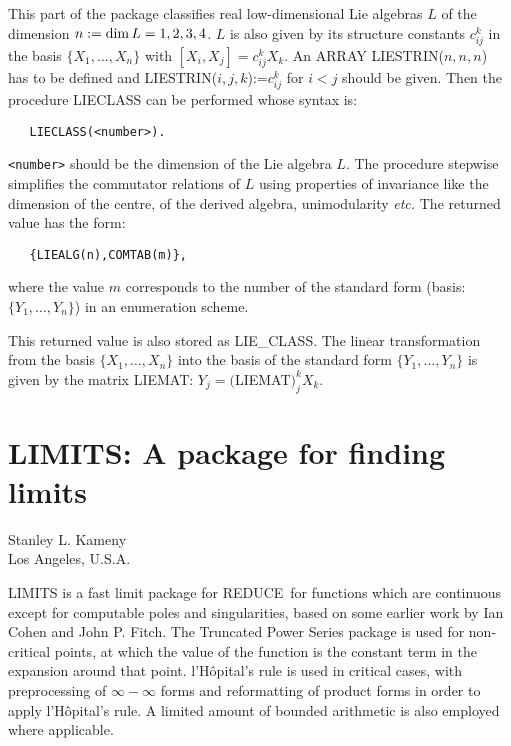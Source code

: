 \documentclass[11pt,letterpaper]{book}
\makeatletter
\newcommand{\REDUCE}{REDUCE}
\newcommand{\underscore}{\_}
\newcommand{\ttindex}[1]{{\renewcommand{\_}{\protect\underscore}%
                          \index{#1@{\tt #1}}}}
\makeatother
\begin{document}
This part of the package classifies real low-dimensional Lie algebras $L$
of the dimension $n:={\rm dim}\,L=1,2,3,4$. $L$ is also given by its
structure constants $c_{ij}^k$ in the basis $\{X_1,\ldots,X_n\}$ with
$[X_i,X_j]=c_{ij}^k X_k$.  An ARRAY
LIESTRIN($n,n,n$) has to be defined and LIESTRIN($i,j,k$):=$c_{ij}^k$ for
$i<j$ should be given. Then the procedure LIECLASS can be performed
whose syntax is:\ttindex{LIECLASS}
{\small\begin{verbatim}
   LIECLASS(<number>).
\end{verbatim}}
{\tt <number>} should be the dimension of the Lie algebra $L$.  The
procedure stepwise simplifies the commutator relations of $L$ using
properties of invariance like the dimension of the centre, of the
derived algebra, unimodularity {\em etc.}  The returned value has the form:
{\small\begin{verbatim}
   {LIEALG(n),COMTAB(m)},
\end{verbatim}}
where the value $m$ corresponds to the number of the standard form (basis:
$\{Y_1, \ldots ,Y_n\}$) in an enumeration scheme.

This returned value is also stored as LIE\_CLASS.  The linear
transformation from the basis $\{X_1,\ldots,X_n\}$ into the basis of
the standard form $\{Y_1,\ldots,Y_n\}$ is given by the matrix LIEMAT:
 $Y_j=($LIEMAT$)_j^k X_k$.

\chapter{LIMITS: A package for finding limits}
\label{LIMITS}

{\footnotesize
\begin{center}
Stanley L. Kameny \\
Los Angeles, U.S.A.
\end{center}
}
\ttindex{LIMITS}

LIMITS is a fast limit package for \REDUCE\ for functions which are
continuous except for computable poles and singularities, based on some
earlier work by Ian Cohen and John P. Fitch.
The Truncated Power Series
package is used for non-critical points, at which the value of the
function is the constant term in the expansion around that point.
l'H\^opital's rule is used in critical cases, with preprocessing of
$\infty - \infty$ forms and reformatting of product forms in order
to apply l'H\^opital's rule.  A limited amount of bounded arithmetic
is also employed where applicable.
\end{document}
